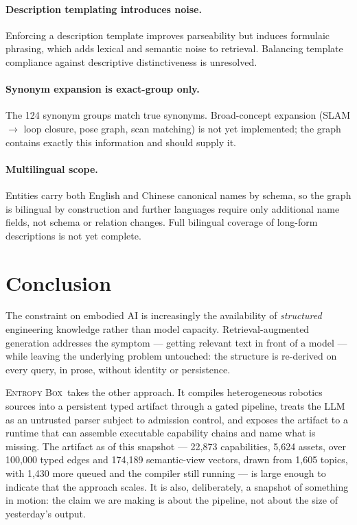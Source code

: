\documentclass[10pt,a4paper]{article}
\newcommand{\eb}{\textsc{Entropy Box}\xspace}
\begin{document}
\paragraph{Description templating introduces noise.} Enforcing a description
template improves parseability but induces formulaic phrasing, which adds
lexical and semantic noise to retrieval. Balancing template compliance against
descriptive distinctiveness is unresolved.

\paragraph{Synonym expansion is exact-group only.} The 124 synonym groups match
true synonyms. Broad-concept expansion (SLAM $\rightarrow$ loop closure, pose
graph, scan matching) is not yet implemented; the graph contains exactly this
information and should supply it.

\paragraph{Multilingual scope.} Entities carry both English and Chinese canonical
names by schema, so the graph is bilingual by construction and further languages
require only additional name fields, not schema or relation changes. Full
bilingual coverage of long-form descriptions is not yet complete.

\section{Conclusion}

The constraint on embodied AI is increasingly the availability of \emph{structured}
engineering knowledge rather than model capacity. Retrieval-augmented generation
addresses the symptom --- getting relevant text in front of a model --- while
leaving the underlying problem untouched: the structure is re-derived on every
query, in prose, without identity or persistence.

\eb\ takes the other approach. It compiles heterogeneous robotics sources into a
persistent typed artifact through a gated pipeline, treats the LLM as an
untrusted parser subject to admission control, and exposes the artifact to a
runtime that can assemble executable capability chains and name what is missing.
The artifact as of this snapshot --- 22{,}873 capabilities, 5{,}624 assets, over
100{,}000 typed edges and 174{,}189 semantic-view vectors, drawn from 1{,}605
topics, with 1{,}430 more queued and the compiler still running --- is large
enough to indicate that the approach scales. It is also, deliberately, a snapshot
of something in motion: the claim we are making is about the pipeline, not about
the size of yesterday's output.
\end{document}
